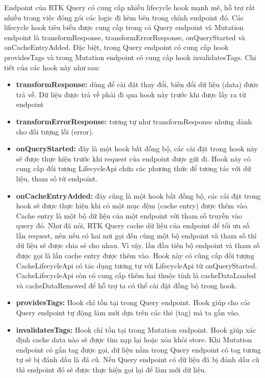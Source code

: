 Endpoint của RTK Query có cung cấp nhiều lifecycle hook mạnh mẽ, hỗ trợ rất nhiều trong việc đóng gói các logic đi kèm bên trong chính endpoint đó.
Các lifecycle hook tiêu biểu được cung cấp trong cả Query endpoint và Mutation endpoint là transformResponse,  transformErrorResponse, onQueryStarted và onCacheEntryAdded.
Đặc biệt, trong Query endpoint có cung cấp hook providesTags và trong Mutation endpoint có cung cấp hook invalidatesTags.
Chi tiết của các hook này như sau:

\begin{itemize}
  \item \textbf{transformResponse:} dùng để cài đặt thay đổi, biến đổi dữ liệu (data) được trả về.
        Dữ liệu được trả về phải đi qua hook này trước khi được lấy ra từ endpoint
  \item \textbf{transformErrorResponse:} tương tự như transformResponse nhưng dành cho đối tượng lỗi (error).
  \item \textbf{onQueryStarted:} đây là một hook bất đồng bộ, các cài đặt trong hook này sẽ được thực hiện trước khi request của endpoint được gửi đi. Hook này có cung cấp đối tượng LifecycleApi chứa các phương thức để tương tác với dữ liệu, tham số từ endpoint.
  \item \textbf{onCacheEntryAdded:} đây cũng là một hook bất đồng bộ, các cài đặt trong hook sẽ được thực hiện khi có một mục đệm (cache entry) được thêm vào.
        Cache entry là một bộ dữ liệu của một endpoint với tham số truyền vào query đó.
        Như đã nói, RTK Query cache dữ liệu của endpoint để tối ưu số lần request, nên nếu có hai nơi gọi đến cùng một bộ endpoint và tham số thì dữ liệu sẽ được chia sẻ cho nhau.
        Vì vậy, lần đầu tiên bộ endpoint và tham số được gọi là lần cache entry được thêm vào.
        Hook này có cũng cấp đối tượng CacheLifecycleApi có tác dụng tương tự với LifecycleApi từ onQueryStarted.
        CacheLifecycleApi còn có cung cấp thêm hai thuộc tính là cacheDataLoaded và cacheDataRemoved để hỗ trợ ta có thể cài đặt đồng bộ trong hook.
  \item \textbf{providesTags:} Hook chỉ tồn tại trong Query endpoint.
        Hook giúp cho các Query endpoint tự động làm mới dựa trên các thẻ (tag) mà ta gắn vào.
  \item \textbf{invalidatesTags:} Hook chỉ tồn tại trong Mutation endpoint.
        Hook giúp xác định cache data nào sẽ được tìm nạp lại hoặc xóa khỏi store.
        Khi Mutation endpoint có gắn tag được gọi, dữ liệu nằm trong Query endpoint có tag tương tự sẽ bị đánh dấu là đã cũ.
        Nếu Query endpoint có dữ liệu đã bị đánh dấu cũ thì endpoint đó sẽ được thực hiện gọi lại để làm mới dữ liệu.
\end{itemize}

